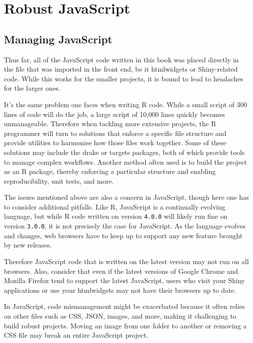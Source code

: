 \documentclass[10pt,]{krantz}
\begin{document}
\hypertarget{part-robust-javascript}{%
\part{Robust JavaScript}\label{part-robust-javascript}}

\hypertarget{webpack-intro}{%
\chapter{Managing JavaScript}\label{webpack-intro}}

Thus far, all of the JavaScript code written in this book was placed directly in the file that was imported in the front end, be it htmlwidgets or Shiny-related code. While this works for the smaller projects, it is bound to lead to headaches for the larger ones.

It's the same problem one faces when writing R code. While a small script of 300 lines of code will do the job, a large script of 10,000 lines quickly becomes unmanageable. Therefore when tackling more extensive projects, the R programmer will turn to solutions that enforce a specific file structure and provide utilities to harmonise how those files work together. Some of these solutions may include the drake \citep{R-drake} or targets \citep{R-targets} packages, both of which provide tools to manage complex workflows. Another method often used is to build the project as an R package, thereby enforcing a particular structure and enabling reproducibility, unit tests, and more.

The issues mentioned above are also a concern in JavaScript, though here one has to consider additional pitfalls. Like R, JavaScript is a continually evolving language, but while R code written on version \texttt{4.0.0} will likely run fine on version \texttt{3.0.0}, it is not precisely the case for JavaScript. As the language evolves and changes, web browsers have to keep up to support any new feature brought by new releases.

Therefore JavaScript code that is written on the latest version may not run on all browsers. Also, consider that even if the latest versions of Google Chrome and Mozilla Firefox tend to support the latest JavaScript, users who visit your Shiny applications or use your htmlwidgets may not have their browsers up to date.

In JavaScript, code mismanagement might be exacerbated because it often relies on other files such as CSS, JSON, images, and more, making it challenging to build robust projects. Moving an image from one folder to another or removing a CSS file may break an entire JavaScript project.
\end{document}
